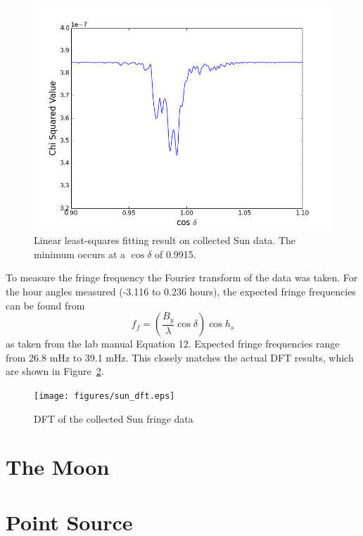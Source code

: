\documentclass[12pt]{article}
\begin{document}
\begin{figure}
\centering
\includegraphics[width=\linewidth]{figures/sun_fit.png}
\caption{Linear least-squares fitting result on collected Sun data. The minimum occurs at a $\cos \delta$ of 0.9915.}
\label{fig:sunfit}
\end{figure}

To measure the fringe frequency the Fourier transform of the data was taken.
For the hour angles measured (-3.116 to 0.236 hours), the expected fringe frequencies can be found from
\begin{equation}
f_f = \left( \frac{B_y}{\lambda} \cos \delta \right) \cos h_s
\end{equation}
as taken from the lab manual Equation 12.
Expected fringe frequencies range from 26.8 mHz to 39.1 mHz.
This closely matches the actual DFT results, which are shown in Figure~\ref{fig:sundft}.

\begin{figure}
\centering
\texttt{[image: figures/sun\_dft.eps]}
\caption{DFT of the collected Sun fringe data}
\label{fig:sundft}
\end{figure}

\section{The Moon}




\section{Point Source}
\end{document}
